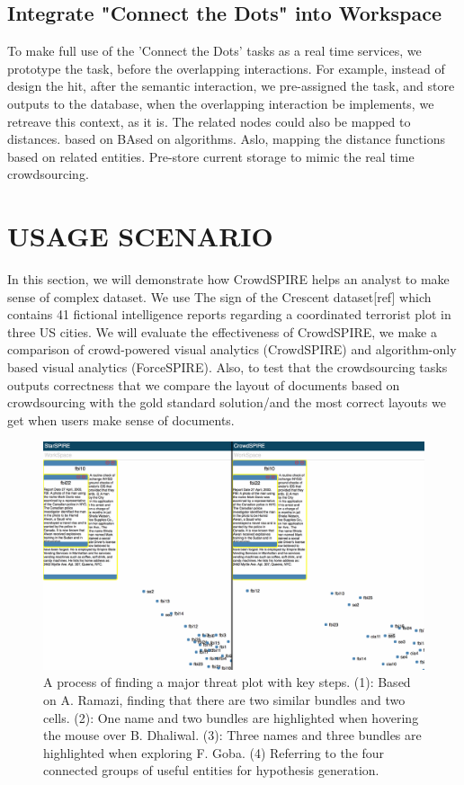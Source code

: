 \documentclass[journal]{vgtc}                %
\begin{document}
\subsection{Integrate "Connect the Dots" into Workspace}
To make full use of the 'Connect the Dots' tasks as a real time services, we prototype the task, before the overlapping interactions.
For example, instead of design the hit, after the semantic interaction, we pre-assigned the task, and store outputs to the database, when the overlapping interaction be implements, we retreave this context, as it is.
The related nodes could also be mapped to distances. based on
BAsed on algorithms. Aslo, mapping the distance functions based on related entities.
Pre-store current storage to mimic the real time crowdsourcing.

\section{USAGE SCENARIO}


In this section, we will demonstrate how CrowdSPIRE helps an analyst to make sense of complex dataset.
We use The sign of the Crescent dataset[ref] which contains 41 fictional intelligence reports regarding a coordinated terrorist plot in three US cities.
We will evaluate the effectiveness of CrowdSPIRE, we make a comparison of crowd-powered visual analytics (CrowdSPIRE) and algorithm-only based visual analytics (ForceSPIRE).
Also, to test that the crowdsourcing tasks outputs correctness that we compare the layout of documents based on crowdsourcing with the gold standard solution/and the most correct layouts we get when users make sense of documents.
\begin{figure}
 \centering
  \includegraphics[width=\textwidth]{Case}
 \caption{A process of finding a major threat plot with key steps. (1): Based on A. Ramazi, finding that there are two similar bundles and two cells. (2): One name and two bundles are highlighted when hovering the mouse over B. Dhaliwal. (3): Three names and three bundles are highlighted when exploring F. Goba. (4) Referring to the four connected groups of useful entities for hypothesis generation.}
 \label{fig:case}
\end{figure}
\end{document}
